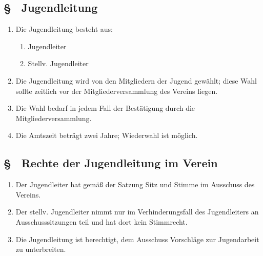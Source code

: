 \subsection{§ \thejoparagraphcounter\ Jugendleitung} \label{jo:par:jugendleitung}
\begin{enumerate}
    \item \label{jo:abs:fnqb6q} Die Jugendleitung besteht aus:
    \begin{enumerate}
        \item Jugendleiter
        
        \item Stellv. Jugendleiter
    \end{enumerate}

    \item \label{jo:abs:86krfo} Die Jugendleitung wird von den Mitgliedern der Jugend gewählt; diese Wahl sollte zeitlich vor der Mitgliederversammlung des Vereins liegen.

    \item \label{jo:abs:0hhncw} Die Wahl bedarf in jedem Fall der Bestätigung durch die Mitgliederversammlung.

    \item \label{jo:abs:bq5ltj} Die Amtszeit beträgt zwei Jahre; Wiederwahl ist möglich.
\end{enumerate}

\subsection{§ \thejoparagraphcounter\ Rechte der Jugendleitung im Verein} \label{jo:par:rechte_jugendleitung}
\begin{enumerate}
    \item \label{jo:abs:oso8pe} Der Jugendleiter hat gemäß  der Satzung Sitz und Stimme im Ausschuss des Vereins.

    \item \label{jo:abs:xo7r87} Der stellv. Jugendleiter nimmt nur im Verhinderungsfall des Jugendleiters an Ausschusssitzungen teil und hat dort kein Stimmrecht.

    \item \label{jo:abs:onf6im} Die Jugendleitung ist berechtigt, dem Ausschuss Vorschläge zur Jugendarbeit zu unterbreiten.
\end{enumerate}

